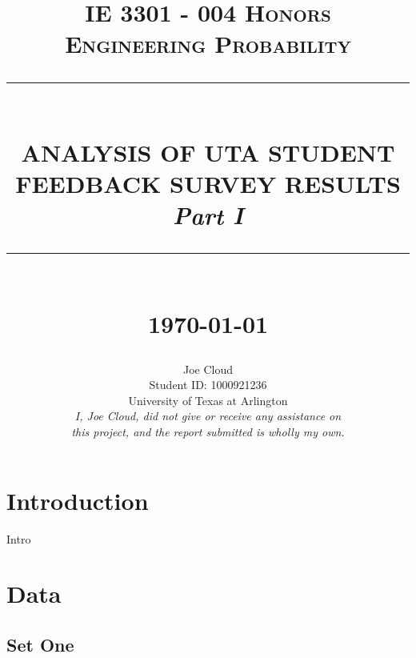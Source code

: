 \documentclass[10pt]{report}
\newcommand{\HRule}[1]{\rule{\linewidth}{#1}}
\begin{document}
\title{ \normalsize \textsc{IE 3301 - 004 Honors\\ Engineering Probability}
        \\ [2.0cm]
        \HRule{0.5pt} \\
        \LARGE \textbf{\uppercase{Analysis of UTA Student Feedback Survey Results}} \\
        \normalsize \textit{Part I}
        \HRule{2pt} \\ [0.5cm]
        \normalsize \today \vspace*{5\baselineskip}}

\date{}

\author{
    Joe Cloud \\
        Student ID: 1000921236 \\
        University of Texas at Arlington \\[1in]
        \textit{I, Joe Cloud, did not give or receive any assistance on }\\
        \textit{this project, and the report submitted is wholly my own.}}



    \maketitle
\tableofcontents
\newpage

\sectionfont{\scshape}

\section*{Introduction}


Intro

\section*{Data}

\subsection*{Set One}
\end{document}
